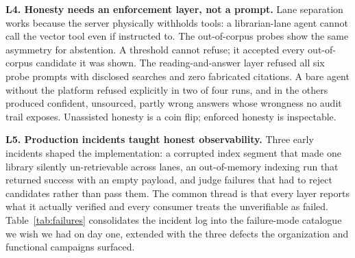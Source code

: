 \noindent\textbf{L4. Honesty needs an enforcement layer, not a prompt.} Lane
separation works because the server physically withholds tools: a
librarian-lane agent cannot call the vector tool even if instructed to. The
out-of-corpus probes show the same asymmetry for abstention. A threshold
cannot refuse; it accepted every out-of-corpus candidate it was shown. The
reading-and-answer layer refused all six probe prompts with disclosed searches
and zero fabricated citations. A bare agent without the platform refused
explicitly in two of four runs, and in the others produced confident,
unsourced, partly wrong answers whose wrongness no audit trail exposes.
Unassisted honesty is a coin flip; enforced honesty is inspectable.

\noindent\textbf{L5. Production incidents taught honest observability.} Three
early incidents shaped the implementation: a corrupted index segment that made
one library silently un-retrievable across lanes, an out-of-memory indexing
run that returned success with an empty payload, and judge failures that had
to reject candidates rather than pass them. The common thread is that every
layer reports what it actually verified and every consumer treats the
unverifiable as failed. Table~\ref{tab:failures} consolidates the incident log
into the failure-mode catalogue we wish we had on day one, extended with the
three defects the organization and functional campaigns surfaced.

